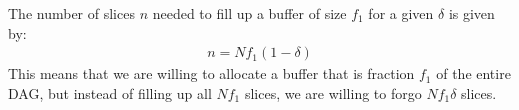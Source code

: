 \documentclass[runningheads]{llncs}
\begin{document}
The number of slices $n$ needed to fill up a buffer of size $f_1$ for a given $\delta$ is given by:
\begin{gather}
	n = Nf_1(1-\delta) %
\end{gather}
This means that we are willing to allocate a buffer that is fraction $f_1$ of the entire DAG, but instead of filling up all $Nf_1$ slices, we are willing to forgo $Nf_1\delta$ slices.
\end{document}
